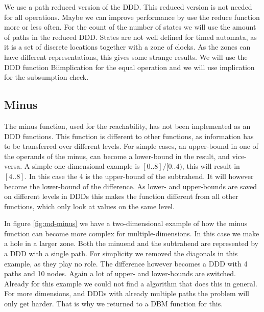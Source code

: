 We use a path reduced version of the DDD. This reduced version is not needed for all operations. Maybe we can improve performance by use the reduce function more or less often. For the count of the number of states we will use the amount of paths in the reduced DDD. States are not well defined for timed automata, as it is a set of discrete locations together with a zone of clocks. As the zones can have different representations, this gives some strange results. We will use the DDD function Biimplication for the equal operation and we will use implication for the subsumption check.

\subsection{Minus}
The minus function, used for the reachability, has not been implemented as an DDD functions. This function is different to other functions, as information has to be transferred over different levels. For simple cases, an upper-bound in one of the operands of the minus, can become a lower-bound in the result, and vice-versa. A simple one dimensional example is $[0..8] / [0..4)$, this will result in $[4..8]$. In this case the 4 is the upper-bound of the subtrahend. It will however become the lower-bound of the difference. As lower- and upper-bounds are saved on different levels in DDDs this makes the function different from all other functions, which only look at values on the same level.

In figure \ref{fig:md-minus} we have a two-dimensional example of how the minus function can become more complex for multiple-dimensions. In this case we make a hole in a larger zone. Both the minuend and the subtrahend are represented by a DDD with a single path. For simplicity we removed the diagonals in this example, as they play no role. The difference however becomes a DDD with 4 paths and 10 nodes. Again a lot of upper- and lower-bounds are switched. Already for this example we could not find a algorithm that does this in general. For more dimensions, and DDDs with already multiple paths the problem will only get harder. That is why we returned to a DBM function for this.



 


